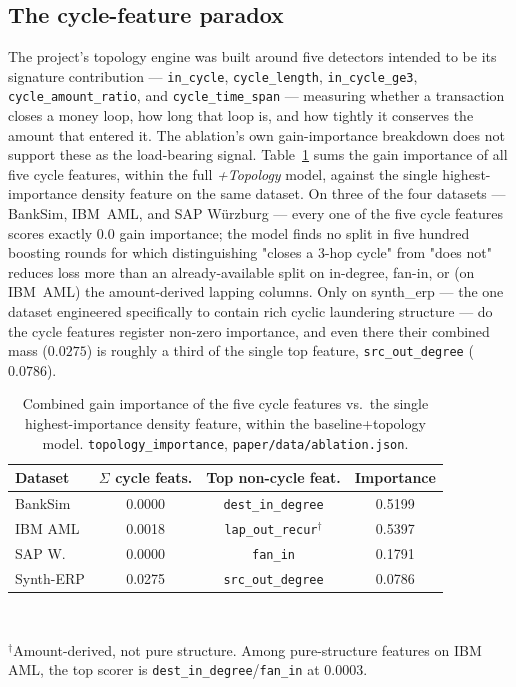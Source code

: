 \subsection{The cycle-feature paradox}
The project's topology engine was built around five detectors intended to be its signature contribution — \texttt{in\_cycle}, \texttt{cycle\_length}, \texttt{in\_cycle\_ge3}, \texttt{cycle\_amount\_ratio}, and \texttt{cycle\_time\_span} — measuring whether a transaction closes a money loop, how long that loop is, and how tightly it conserves the amount that entered it. The ablation's own gain-importance breakdown does not support these as the load-bearing signal. Table~\ref{tab:cycle-importance} sums the gain importance of all five cycle features, within the full \emph{+Topology} model, against the single highest-importance density feature on the same dataset. On three of the four datasets — BankSim, IBM~AML, and SAP W\"urzburg — every one of the five cycle features scores exactly $0.0$ gain importance; the model finds no split in five hundred boosting rounds for which distinguishing "closes a 3-hop cycle" from "does not" reduces loss more than an already-available split on in-degree, fan-in, or (on IBM~AML) the amount-derived lapping columns. Only on synth\_erp — the one dataset engineered specifically to contain rich cyclic laundering structure — do the cycle features register non-zero importance, and even there their combined mass ($0.0275$) is roughly a third of the single top feature, \texttt{src\_out\_degree} ($0.0786$).

\begin{table}[t]
\centering
\caption{Combined gain importance of the five cycle features vs.\ the single highest-importance density feature, within the baseline+topology model. \texttt{topology\_importance}, \texttt{paper/data/ablation.json}.}
\label{tab:cycle-importance}
\small
\begin{tabular}{lccc}
\toprule
Dataset & $\Sigma$ cycle feats. & Top non-cycle feat. & Importance \\
\midrule
BankSim & 0.0000 & \texttt{dest\_in\_degree} & 0.5199 \\
IBM AML & 0.0018 & \texttt{lap\_out\_recur}$^\dagger$ & 0.5397 \\
SAP W. & 0.0000 & \texttt{fan\_in} & 0.1791 \\
Synth-ERP & 0.0275 & \texttt{src\_out\_degree} & 0.0786 \\
\bottomrule
\end{tabular}
\\[3pt]
\raggedright{\scriptsize $^\dagger$Amount-derived, not pure structure. Among pure-structure features on IBM AML, the top scorer is \texttt{dest\_in\_degree}/\texttt{fan\_in} at $0.0003$.}
\end{table}

